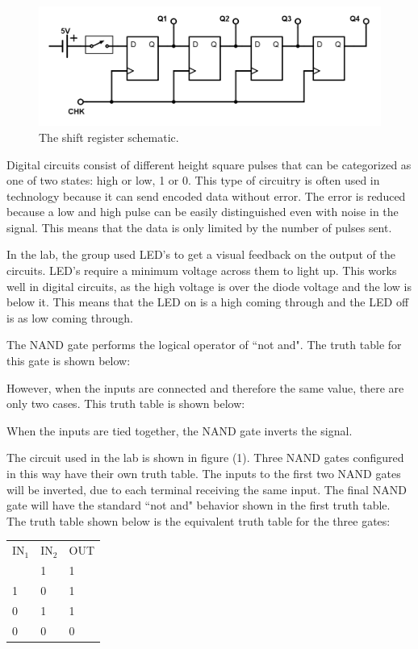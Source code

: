 \documentclass[twocolumn, amsmath]{revtex4}
\begin{document}
\begin{figure}[h]
    \includegraphics[scale=0.26]{bitshifter.png}  
    \caption{The shift register schematic.}
\end{figure}

Digital circuits consist of different height square pulses that can be categorized as one of two states: high or low, 1 or 0. This type of circuitry is often used in technology because it can send encoded data without error. The error is reduced because a low and high pulse can be easily distinguished even with noise in the signal. This means that the data is only limited by the number of pulses sent.

In the lab, the group used LED's to get a visual feedback on the output of the circuits. 
LED's require a minimum voltage across them to light up. This works well in digital circuits, as the high voltage is over the diode voltage and the low is below it. This means that the LED on is a high coming through and the LED off is as low coming through.

The NAND gate performs the logical operator of ``not and". The truth table for this gate is shown below:


However, when the inputs are connected and therefore the same value, there are only two cases. This truth table is shown below:



When the inputs are tied together, the NAND gate inverts the signal. 

The circuit used in the lab is shown in figure (1). Three NAND gates configured in this way have their own truth table. The inputs to the first two NAND gates will be inverted, due to each terminal receiving the same input. The final NAND gate will have the standard ``not and" behavior shown in the first truth table. The truth table shown below is the equivalent truth table for the three gates:

\begin{center}
	\begin{ruledtabular}
    \begin{tabular}{ l l l}
	IN$_1$ & IN$_2$ & OUT\\ \colrule
	1 & 1 & 1 \\
	1 & 0 & 1 \\
	0 & 1 & 1 \\
	0 & 0 & 0  \\
\end{tabular}
    \end{ruledtabular}
\end{center}
\end{document}
